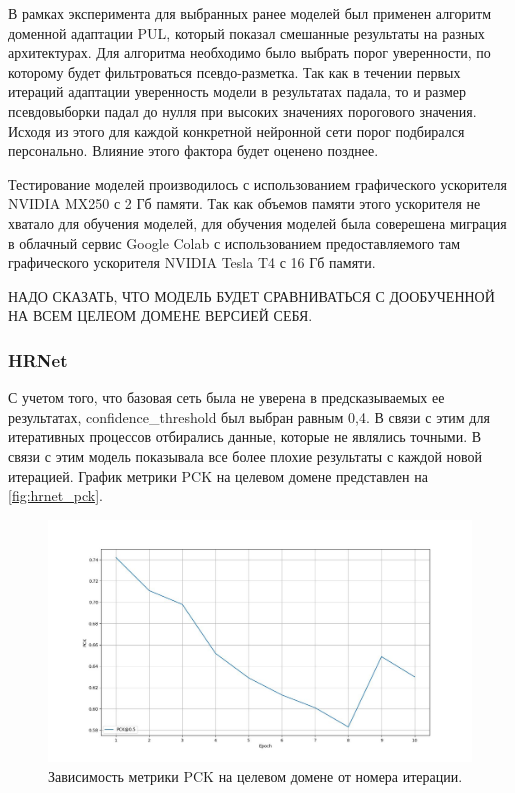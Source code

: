 В рамках эксперимента для выбранных ранее моделей был применен алгоритм доменной адаптации PUL, который показал смешанные результаты на разных архитектурах. Для алгоритма необходимо было выбрать порог уверенности, по которому будет фильтроваться псевдо-разметка. Так как в течении первых итераций адаптации уверенность модели в результатах падала, то и размер псевдовыборки падал до нулля при высоких значениях порогового значения. Исходя из этого для каждой конкретной нейронной сети порог подбирался персонально. Влияние этого фактора будет оценено позднее.



Тестирование моделей производилось с использованием графического ускорителя NVIDIA MX250 с 2 Гб памяти. Так как объемов памяти этого ускорителя не хватало для обучения моделей, для обучения моделей была соверешена миграция в облачный сервис Google Colab с использованием предоставляемого там графического ускорителя NVIDIA Tesla T4 с 16 Гб памяти.

НАДО СКАЗАТЬ, ЧТО МОДЕЛЬ БУДЕТ СРАВНИВАТЬСЯ С ДООБУЧЕННОЙ НА ВСЕМ ЦЕЛЕОМ ДОМЕНЕ ВЕРСИЕЙ СЕБЯ.

\subsubsection*{HRNet}

С учетом того, что базовая сеть была не уверена в предсказываемых ее результатах, confidence\_threshold был выбран равным 0,4. В связи с этим для итеративных процессов отбирались данные, которые не являлись точными. В связи с этим модель показывала все более плохие результаты с каждой новой итерацией. График метрики PCK на целевом домене представлен на \autoref{fig:hrnet_pck}. 

\begin{figure}[h]
	\centering
	\includegraphics[width=\textwidth]{./images/results/hrnet_pck}
	\caption{Зависимость метрики PCK на целевом домене от номера итерации.}
	\label{fig:hrnet_pck}
\end{figure}

